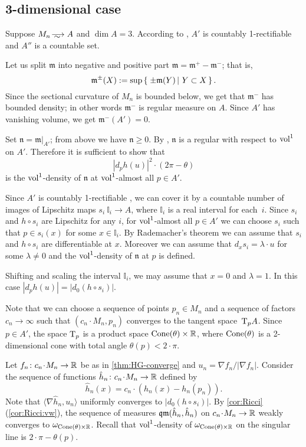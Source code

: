 \subsection{3-dimensional case}


Suppose $M_n\smooths{}A$ and $\dim A=3$.
According to \cite{li-naber}, $A'$ is countably 1-rectifiable and $A''$ is a countable set. 

Let us split $\mathfrak m$ into negative and positive part $\mathfrak m=\mathfrak m^+-\mathfrak m^-$; that is,
\[\mathfrak m^\pm(X)\df\sup\set{\pm\mathfrak m(Y)}{Y\subset X}.\]
Since the sectional curvature of $M_n$ is bounded below, we get that $\mathfrak m^-$ has bounded density; in other words $\mathfrak m^-$ is regular measure on $A$.
Since $A'$ has vanishing volume, we get $\mathfrak m^-(A')=0$.

Set $\mathfrak n=\mathfrak m|_{A'}$; from above we have $\mathfrak n\ge 0$.
By \cite{petrunin-SC}, $\mathfrak n$ is a regular with respect to $\operatorname{vol}^1$ on $A'$.
Therefore it is sufficient to show that 
\[|d_ph(u)|^2\cdot (2\pi-\theta)\]
is the $\operatorname{vol}^1$-density of $\mathfrak n$
at $\operatorname{vol}^1$-almost all $p\in A'$.

Since $A'$ is countably 1-rectifiable \cite{li-naber}, we can cover it by a countable number of images of Lipschitz maps $s_i\:\mathbb{I}_i\to A$, where $\mathbb{I}_i$ is a real interval for each~$i$.
Since $s_i$ and $h\circ s_i$ are Lipschitz for any $i$, for $\operatorname{vol}^1$-almost all $p\in A'$ we can choose $s_i$ such that $p\in s_i(x)$ for some $x\in \mathbb{I}_i$.
By Rademacher's theorem we can assume that $s_i$ and $h\circ s_i$ are differentiable at $x$.
Moreover we can assume that $d_xs_i=\lambda\cdot u$ for some $\lambda\ne 0$ and the $\operatorname{vol}^1$-density of $\mathfrak n$ at $p$ is defined.

Shifting and scaling the interval $\mathbb{I}_i$, we may assume that $x=0$ and $\lambda=1$.
In this case $|d_ph(u)|=|d_0(h\circ s_i)|$.

Note that we can choose a sequence of points $p_n\in M_n$ and a sequence of factors $c_n\to \infty$ such that $(c_n\cdot M_n,p_n)$ converges to the tangent space~$\mathrm{T}_pA$.
Since $p\in A'$, the space $\mathrm{T}_p$ is a product space $\operatorname{Cone}(\theta)\times\mathbb{R}$, where $\operatorname{Cone}(\theta)$ is a 2-dimensional cone with total angle $\theta(p)<2\cdot\pi$.

Let $f_n\:c_n\cdot M_n\to \RR$ be as in \ref{thm:HG-converge} and $u_n=\nabla f_n/|\nabla f_n|$.
Consider the sequence of functions $\hat h_n\:c_n\cdot M_n\to \RR$ defined by 
\[\hat h_n(x)=c_n\cdot(h_n(x)-h_n(p_n)).\]
Note that $\langle\nabla \hat h_n,u_n\rangle$ uniformly converges to  $|d_0(h\circ s_i)|$.
By \ref{cor:Ricci}(\ref{cor:Ricci:vw}), the sequence of measures $\operatorname{\mathfrak{qm}}(\hat h_n, \hat h_n)$ on $c_n\cdot M_n\to \RR$ weakly converges to $\omega_{\operatorname{Cone}(\theta)\times\mathbb{R}}$.
Recall that $\operatorname{vol}^1$-density of $\omega_{\operatorname{Cone}(\theta)\times\mathbb{R}}$ on the singular line is $2\cdot \pi-\theta(p)$.

